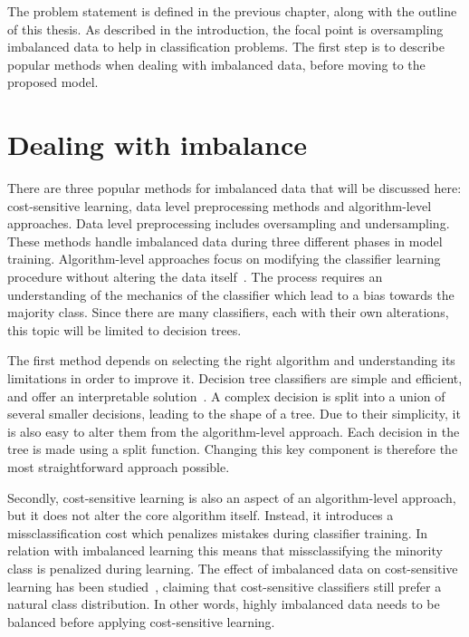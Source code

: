 The problem statement is defined in the previous chapter, along with the outline of this thesis. As described in the introduction, the focal point is oversampling imbalanced data to help in classification problems. The first step is to describe popular methods when dealing with imbalanced data, before moving to the proposed model.

\section{Dealing with imbalance}
There are three popular methods for imbalanced data that will be discussed here: cost-sensitive learning, data level preprocessing methods and algorithm-level approaches. Data level preprocessing includes oversampling and undersampling. These methods handle imbalanced data during three different phases in model training. Algorithm-level approaches focus on modifying the classifier learning procedure without altering the data itself~\cite{Fernandez2018LearningSets}. The process requires an understanding of the mechanics of the classifier which lead to a bias towards the majority class. Since there are many classifiers, each with their own alterations, this topic will be limited to decision trees.

The first method depends on selecting the right algorithm and understanding its limitations in order to improve it. Decision tree classifiers are simple and efficient, and offer an interpretable solution~\cite{Safavian1991AMethodology}. A complex decision is split into a union of several smaller decisions, leading to the shape of a tree. Due to their simplicity, it is also easy to alter them from the algorithm-level approach. Each decision in the tree is made using a split function. Changing this key component is therefore the most straightforward approach possible. 

Secondly, cost-sensitive learning is also an aspect of an algorithm-level approach, but it does not alter the core algorithm itself. Instead, it introduces a missclassification cost which penalizes mistakes during classifier training. In relation with imbalanced learning this means that missclassifying the minority class is penalized during learning. The effect of imbalanced data on cost-sensitive learning has been studied~\cite{Liu2006TheStudy}, claiming that cost-sensitive classifiers still prefer a natural class distribution. In other words, highly imbalanced data needs to be balanced before applying cost-sensitive learning.

